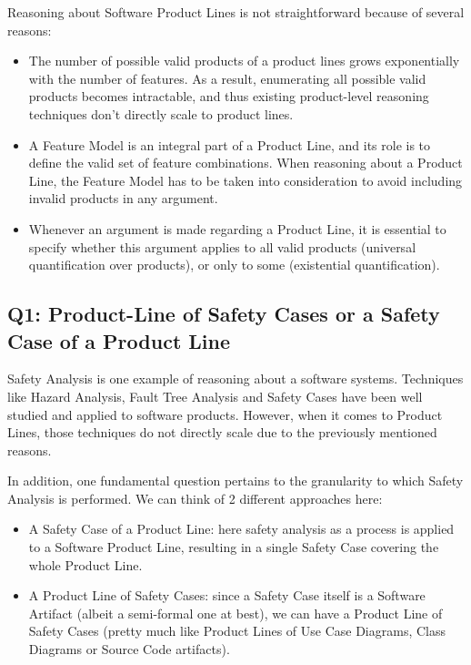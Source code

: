 \documentclass[11pt]{article}
\begin{document}
Reasoning about Software Product Lines is not straightforward because of several reasons:

\begin{itemize}

\item The number of possible valid products of a product lines grows exponentially with the number of features. As a result, enumerating all possible valid products becomes intractable, and thus existing product-level reasoning techniques don't directly scale to product lines.

\item A Feature Model is an integral part of a Product Line, and its role is to define the valid set of feature combinations. When reasoning about a Product Line, the Feature Model has to be taken into consideration to avoid including invalid products in any argument.

\item Whenever an argument is made regarding a Product Line, it is essential to specify whether this argument applies to all valid products (universal quantification over products), or only to some (existential quantification). 

\end{itemize}

\subsection{Q1: Product-Line of Safety Cases or a Safety Case of a Product Line}

Safety Analysis is one example of reasoning about a software systems. Techniques like Hazard Analysis, Fault Tree Analysis and Safety Cases have been well studied and applied to software products. However, when it comes to Product Lines, those techniques do not directly scale due to the previously mentioned reasons. 

In addition, one fundamental question pertains to the granularity to which Safety Analysis is performed. We can think of 2 different approaches here:

\begin{itemize}

\item A Safety Case of a Product Line: here safety analysis as a process is applied to a Software Product Line, resulting in a single Safety Case covering the whole Product Line.

\item A Product Line of Safety Cases: since a Safety Case itself is a Software Artifact (albeit a semi-formal one at best), we can have a Product Line of Safety Cases (pretty much like Product Lines of Use Case Diagrams, Class Diagrams or Source Code artifacts). 

\end{itemize}
\end{document}
